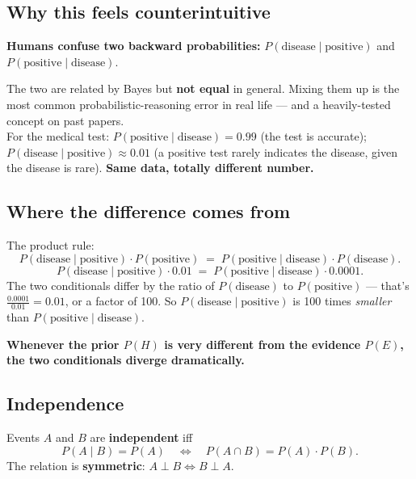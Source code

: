 \documentclass[11pt, a4paper]{article}
\begin{document}
\subsection{Why this feels counterintuitive}

\textbf{Humans confuse two backward probabilities:} $P(\text{disease} \mid \text{positive})$ and $P(\text{positive} \mid \text{disease})$.

\begin{trapbox}
The two are related by Bayes but \textbf{not equal} in general. Mixing them up is the most common probabilistic-reasoning error in real life — and a heavily-tested concept on past papers.\\[0.3em]
For the medical test: $P(\text{positive} \mid \text{disease}) = 0.99$ (the test is accurate); $P(\text{disease} \mid \text{positive}) \approx 0.01$ (a positive test rarely indicates the disease, given the disease is rare). \textbf{Same data, totally different number.}
\end{trapbox}

\subsection{Where the difference comes from}

The product rule:
\[
P(\text{disease} \mid \text{positive}) \cdot P(\text{positive}) \;=\; P(\text{positive} \mid \text{disease}) \cdot P(\text{disease}).
\]
\[
P(\text{disease} \mid \text{positive}) \cdot 0.01 \;=\; P(\text{positive} \mid \text{disease}) \cdot 0.0001.
\]
The two conditionals differ by the ratio of $P(\text{disease})$ to $P(\text{positive})$ — that's $\frac{0.0001}{0.01} = 0.01$, or a factor of 100. So $P(\text{disease} \mid \text{positive})$ is 100 times \emph{smaller} than $P(\text{positive} \mid \text{disease})$.

\textbf{Whenever the prior $P(H)$ is very different from the evidence $P(E)$, the two conditionals diverge dramatically.}

\subsection{Independence}

\begin{defbox}[Independence]
Events $A$ and $B$ are \textbf{independent} iff
\[
P(A \mid B) = P(A) \quad \Longleftrightarrow \quad P(A \cap B) = P(A) \cdot P(B).
\]
The relation is \textbf{symmetric}: $A \perp B \iff B \perp A$.
\end{defbox}
\end{document}
